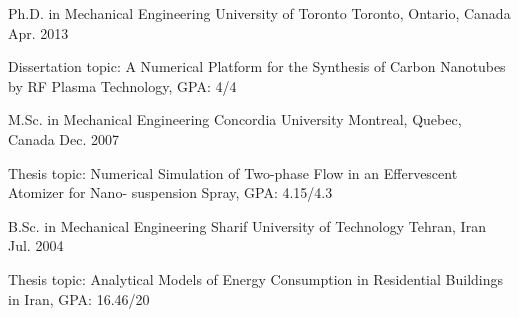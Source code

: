 


\begin{cventries}


\cventry
{Ph.D. in Mechanical Engineering} %
{University of Toronto} %
{Toronto, Ontario, Canada} %
{Apr. 2013 } %
{ %
\begin{cvitems}
\item {Dissertation topic: A Numerical Platform for the Synthesis of Carbon Nanotubes by RF Plasma
Technology, GPA: 4/4}
\end{cvitems}
}


\cventry
{M.Sc. in Mechanical Engineering} %
{Concordia University} %
{Montreal, Quebec, Canada} %
{Dec. 2007 } %
{ %
\begin{cvitems}
\item {Thesis topic: Numerical Simulation of Two-phase Flow in an Effervescent Atomizer for Nano-
suspension Spray, GPA: 4.15/4.3}
\end{cvitems}
}


\cventry
{B.Sc. in Mechanical Engineering} %
{Sharif University of Technology} %
{Tehran, Iran} %
{Jul. 2004 } %
{ %
\begin{cvitems}
\item {Thesis topic: Analytical Models of Energy Consumption in Residential Buildings in Iran, GPA:
16.46/20}
\end{cvitems}
}


\end{cventries}